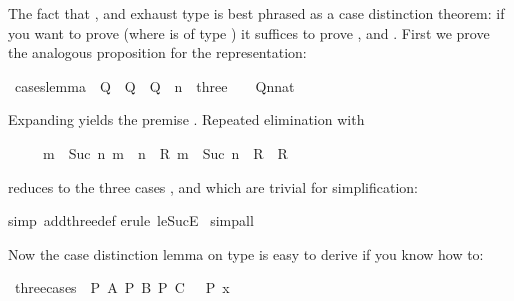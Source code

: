 \begin{isabellebody}
\begin{isamarkuptext}
The fact that ,  and  exhaust type  is
best phrased as a case distinction theorem: if you want to prove 
(where  is of type ) it suffices to prove ,
 and . First we prove the analogous proposition for the
representation:%
\end{isamarkuptext}%
\ cases{\isacharunderscore}lemma{\isacharcolon}\ {\isachardoublequote}{\isasymlbrakk}\ Q\ {}{\isacharsemicolon}\ Q\ {}{\isacharsemicolon}\ Q\ {}{\isacharsemicolon}\ n\ {\isacharcolon}\ three\ {\isasymrbrakk}\ {\isasymLongrightarrow}\ \ Q{\isacharparenleft}n{\isacharcolon}{\isacharcolon}nat{\isacharparenright}{\isachardoublequote}%
\begin{isamarkuptxt}%
\noindent
Expanding  yields the premise . Repeated
elimination with 
\begin{isabelle}%
\ \ \ \ \ {\isasymlbrakk}{\isacharquery}m\ {\isasymle}\ Suc\ {\isacharquery}n{\isacharsemicolon}\ {\isacharquery}m\ {\isasymle}\ {\isacharquery}n\ {\isasymLongrightarrow}\ {\isacharquery}R{\isacharsemicolon}\ {\isacharquery}m\ {\isacharequal}\ Suc\ {\isacharquery}n\ {\isasymLongrightarrow}\ {\isacharquery}R{\isasymrbrakk}\ {\isasymLongrightarrow}\ {\isacharquery}R%
\end{isabelle}
reduces  to the three cases ,  and
 which are trivial for simplification:%
\end{isamarkuptxt}%
simp\ add{\isacharcolon}three{\isacharunderscore}def{\isacharparenright}\isanewline
{}erule\ le{\isacharunderscore}SucE{\isacharparenright}{\isacharplus}{\isacharparenright}\isanewline
{}\ simp{\isacharunderscore}all\isanewline
{}%
\begin{isamarkuptext}%
Now the case distinction lemma on type  is easy to derive if you know how to:%
\end{isamarkuptext}%
\ three{\isacharunderscore}cases{\isacharcolon}\ {\isachardoublequote}{\isasymlbrakk}\ P\ A{\isacharsemicolon}\ P\ B{\isacharsemicolon}\ P\ C\ {\isasymrbrakk}\ {\isasymLongrightarrow}\ P\ x{\isachardoublequote}%
\begin{isamarkuptxt}%

\end{isamarkuptxt}
\end{isabellebody}
